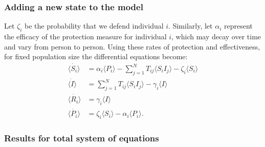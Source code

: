 \documentclass[../report.tex]{subfiles}
\begin{document}
\subsubsection{Adding a new state to the model}

Let $\zeta_i$ be the probability that we defend individual $i$.
Similarly, let $\alpha_i$ represent the efficacy of the protection measure for individual $i$, which may decay over time and vary from person to person. Using these rates of protection and effectiveness, for fixed population size the differential equations become:
\begin{align}
\dot{\langle S_i \rangle} & = \alpha_i \langle P_i \rangle - \sum^{N}_{j=1}T_{ij} \langle S_i I_j \rangle - \zeta_i\langle S_i \rangle\\
\dot{\langle I \rangle} & =\sum^{N}_{j=1}T_{ij}\langle S_i I_j \rangle - \gamma_i \langle I \rangle \\
\dot{\langle R_i \rangle} & = \gamma_i \langle I \rangle \\
\dot{\langle P_i \rangle} & = \zeta_i \langle S_i \rangle - \alpha_i \langle P_i \rangle.
\end{align} 

\subsubsection{Results for total system of equations}
\end{document}
